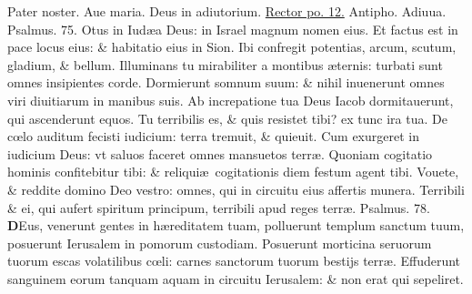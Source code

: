 \documentclass[a5paper,10pt]{book}
\def\ae{æ}
\def\oe{œ}
\begin{document}
\begin{multicols*}{2}
\par \noindent \color{red} P\color{black}ater noster. Aue maria. Deus in adiutorium. \hyperlink{Rectorpo}{Rector po. 12.} \color{red} Antipho. \color{black} Adiuua. \color{red} Psalmus. \hypertarget{ps75}{75.} \color{black}
Otus in Iud\ae a Deus: in Israel magnum nomen eius.
\newline \color{red} E\color{black}t factus est in pace locus eius: \& habitatio eius in Sion.
\newline \color{red} I\color{black}bi confregit potentias, arcum, scutum, gladium, \& bellum.%
\newline \color{red} I\color{black}lluminans tu mirabiliter a montibus \ae ternis: turbati sunt omnes insipientes corde.
\newline \color{red} D\color{black}ormierunt somnum suum: \& nihil inuenerunt omnes viri diuitiarum in manibus suis.
\newline \color{red} A\color{black}b increpatione tua Deus Iacob dormitauerunt, qui ascenderunt equos.
\newline \color{red} T\color{black}u terribilis es, \& quis resistet tibi? ex tunc ira tua.
\newline \color{red} D\color{black}e c\oe lo auditum fecisti iudicium: terra tremuit, \& quieuit.
\newline \color{red} C\color{black}um exurgeret in iudicium Deus: vt saluos faceret omnes mansuetos terr\ae .
\newline \color{red} Q\color{black}uoniam cogitatio hominis confitebitur tibi: \& reliqui\ae \ cogitationis diem festum agent tibi.
\newline \color{red} V\color{black}ouete, \& reddite domino Deo vestro: omnes, qui in circuitu eius affertis munera.
\newline \color{red} T\color{black}erribili \& ei, qui aufert spiritum principum, terribili apud reges terr\ae .
\newline \color{red} Psalmus. \hypertarget{ps78}{78.} \color{black}
\vspace{-.25em}
\lettrine[lines=2]{\bfseries \color{red} D}{}Eus, venerunt gentes in h\ae reditatem tuam, polluerunt templum sanctum tuum, posuerunt Ierusalem in pomorum custodiam.
\newline \color{red} P\color{black}osuerunt morticina seruorum tuorum escas volatilibus c\oe li: carnes sanctorum tuorum bestijs terr\ae .
\newline \color{red} E\color{black}ffuderunt sanguinem eorum tanquam aquam in circuitu Ierusalem: \& non erat qui sepeliret.

\end{multicols*}
\end{document}
